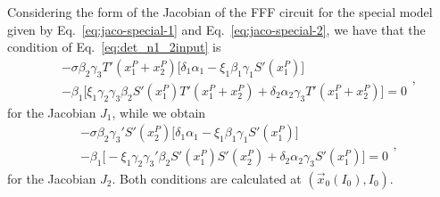 Considering the form of the Jacobian of the FFF circuit for the special
model given by Eq.~\ref{eq:jaco-special-1} and Eq.~\ref{eq:jaco-special-2},
we have that the condition of Eq.~\ref{eq:det_n1_2input} is 
\begin{equation}
    \begin{split}
        &-\sigma \beta_2 \gamma_3 T'(x_1^P + x_2^P) 
        \bigg[ \delta_1 \alpha_1 - \xi_1\beta_1\gamma_1 S'(x_1^P) \bigg] \\ 
        &-\beta_1 \bigg[ \xi_1\gamma_2\gamma_3\beta_2 S'(x_1^P)T'(x_1^P + x_2^P)
        + \delta_2\alpha_2\gamma_3 T'(x_1^P + x_2^P) \bigg] = 0
    \end{split},
\end{equation}
for the Jacobian $J_1$, while we obtain
\begin{equation}
    \begin{split}
        &-\sigma \beta_2 \gamma_3' S'(x_2^P) 
        \bigg[ \delta_1 \alpha_1 - \xi_1\beta_1\gamma_1 S'(x_1^P) \bigg] \\ 
        &-\beta_1 \bigg[ - \xi_1\gamma_2\gamma_3'\beta_2 S'(x_1^P)S'(x_2^P)
        + \delta_2\alpha_2\gamma_3 S'(x_1^P) \bigg] = 0
    \end{split},
\end{equation}
for the Jacobian $J_2$. Both conditions are calculated at $(\vec{x}_0(I_0), I_0)$.